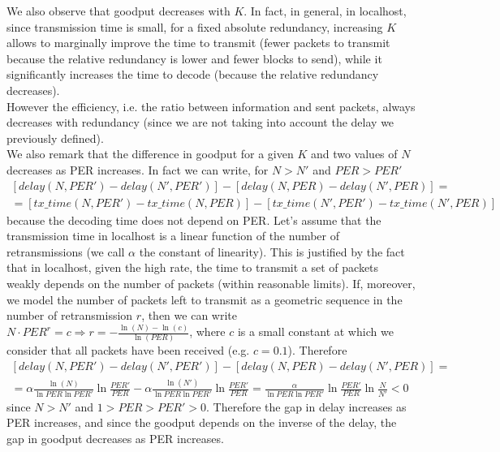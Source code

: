 We also observe that goodput decreases with $K$. In fact, in general, in localhost, since transmission time is small, for a fixed absolute redundancy, increasing $K$ allows to marginally improve the time to transmit (fewer packets to transmit because the relative redundancy is lower and fewer blocks to send), while it significantly increases the time to decode (because the relative redundancy decreases). \\
However the efficiency, i.e. the ratio between information and sent packets, always decreases with redundancy (since we are not taking into account the delay we previously defined).\\
We also remark that the difference in goodput for a given $K$ and two values of $N$ decreases as PER increases. In fact we can write, for $N>N'$ and $PER>PER'$
\begin{equation*}
\begin{split}
[delay(N,PER')-delay(N',PER')]-[delay(N,PER)-delay(N',PER)]=\\
=[tx\_time(N,PER')-tx\_time(N,PER)]-[tx\_time(N',PER')-tx\_time(N',PER)]
\end{split}
\end{equation*}
because the decoding time does not depend on PER. Let's assume that the transmission time in localhost is a linear function of the number of retransmissions (we call $\alpha$ the constant of linearity). This is justified by the fact that in localhost, given the high rate, the time to transmit a set of packets weakly depends on the number of packets (within reasonable limits). If, moreover, we model the number of packets left to transmit as a geometric sequence in the number of retransmission $r$, then we can write $N\cdot PER^r=c \Rightarrow r=-\frac{\ln(N)-\ln(c)}{\ln(PER)}$, where $c$ is a small constant at which we consider that all packets have been received (e.g. $c=0.1$). Therefore
\begin{equation*}
\begin{split}
[delay(N,PER')-delay(N',PER')]-[delay(N,PER)-delay(N',PER)]=\\ 
=\alpha\frac{\ln(N)}{\ln PER \ln PER'}\ln{\frac{PER'}{PER}}-\alpha\frac{\ln(N')}{\ln PER \ln PER'}\ln{\frac{PER'}{PER}}=\frac{\alpha}{\ln PER \ln PER'}\ln{\frac{PER'}{PER}}\ln{\frac{N}{N'}}<0
\end{split}
\end{equation*}
since $N>N'$ and $1>PER>PER'>0$. Therefore the gap in delay increases as PER increases, and since the goodput depends on the inverse of the delay, the gap in goodput decreases as PER increases.

